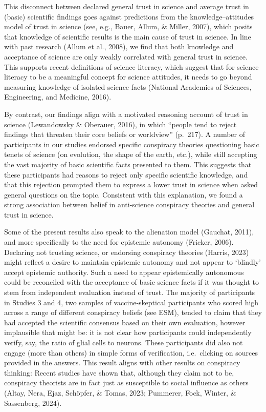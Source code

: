 \documentclass[
  doc,floatsintext]{apa6}
\begin{document}
This disconnect between declared general trust in science and average trust in (basic) scientific findings goes against predictions from the knowledge--attitudes model of trust in science (see, e.g., Bauer, Allum, \& Miller, 2007), which posits that knowledge of scientific results is the main cause of trust in science. In line with past research (Allum et al., 2008), we find that both knowledge and acceptance of science are only weakly correlated with general trust in science. This supports recent definitions of science literacy, which suggest that for science literacy to be a meaningful concept for science attitudes, it needs to go beyond measuring knowledge of isolated science facts (National Academies of Sciences, Engineering, and Medicine, 2016).

By contrast, our findings align with a motivated reasoning account of trust in science (Lewandowsky \& Oberauer, 2016), in which ``people tend to reject findings that threaten their core beliefs or worldview'' (p.~217). A number of participants in our studies endorsed specific conspiracy theories questioning basic tenets of science (on evolution, the shape of the earth, etc.), while still accepting the vast majority of basic scientific facts presented to them. This suggests that these participants had reasons to reject only specific scientific knowledge, and that this rejection prompted them to express a lower trust in science when asked general questions on the topic. Consistent with this explanation, we found a strong association between belief in anti-science conspiracy theories and general trust in science.

Some of the present results also speak to the alienation model (Gauchat, 2011), and more specifically to the need for epistemic autonomy (Fricker, 2006). Declaring not trusting science, or endorsing conspiracy theories (Harris, 2023) might reflect a desire to maintain epistemic autonomy and not appear to `blindly' accept epistemic authority. Such a need to appear epistemically autonomous could be reconciled with the acceptance of basic science facts if it was thought to stem from independent evaluation instead of trust. The majority of participants in Studies 3 and 4, two samples of vaccine-skeptical participants who scored high across a range of different conspiracy beliefs (see ESM), tended to claim that they had accepted the scientific consensus based on their own evaluation, however implausible that might be: it is not clear how participants could independently verify, say, the ratio of glial cells to neurons. These participants did also not engage (more than others) in simple forms of verification, i.e.~clicking on sources provided in the answers. This result aligns with other results on conspiracy thinking: Recent studies have shown that, although they claim not to be, conspiracy theorists are in fact just as susceptible to social influence as others (Altay, Nera, Ejaz, Schöpfer, \& Tomas, 2023; Pummerer, Fock, Winter, \& Sassenberg, 2024).
\end{document}

